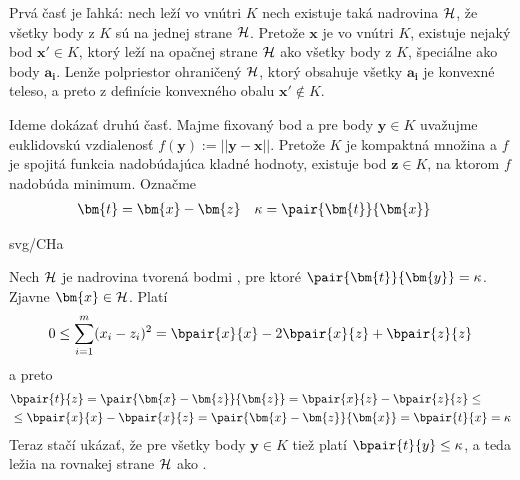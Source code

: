 \begin{shaded}
\begin{dokaz}
  Prvá časť je ľahká: nech  leží vo vnútri $K$ nech existuje taká nadrovina $\cal H$, že všetky body z $K$
  sú na jednej strane $\cal H$. Pretože $\bm{x}$ je vo vnútri $K$, existuje nejaký bod $\bm{x'}\in K$, ktorý leží
  na opačnej strane $\cal H$ ako všetky body z $K$, špeciálne ako body $\bm{a_i}$. 
  Lenže polpriestor ohraničený $\cal H$, ktorý obsahuje 
  všetky $\bm{a_i}$ je konvexné teleso, a preto z definície konvexného obalu $\bm{x'}\not\in K$.

\noindent
Ideme dokázať druhú časť.
Majme fixovaný  bod  a pre body $\bm{y}\in K$ uvažujme euklidovskú vzdialenosť $f(\bm{y}):=||\bm{y}-\bm{x}||$. 
  Pretože $K$ je kompaktná množina a $f$ je spojitá funkcia nadobúdajúca kladné hodnoty, existuje bod
  $\bm{z}\in K$, na ktorom $f$ nadobúda minimum. Označme 
  \begin{align*}
    \bm{t}&=\bm{x}-\bm{z} & \kappa&= \pair{\bm{t}}{\bm{x}}
  \end{align*}

\begin{minipage}[t]{4.5cm}
  \vspace{0pt}
  \begin{myfig}{\textwidth}{svg/CHa}
  \end{myfig}
\end{minipage}\hspace*{1cm}\begin{minipage}[t]{\textwidth-7cm}
  \vspace{0pt}
  Nech $\cal H$ je nadrovina tvorená bodmi , pre ktoré $\pair{\bm{t}}{\bm{y}}=\kappa$.
  Zjavne $\bm{x}\in{\cal H}$. Platí
  $$0\le\sum_{i=1}^m(x_i-z_i)^2=%
  \bpair{x}{x}-2\bpair{x}{z}+\bpair{z}{z}$$
  a preto
  \begin{align*}&\bpair{t}{z}=\pair{\bm{x}-\bm{z}}{\bm{z}}=\bpair{x}{z}-\bpair{z}{z}\le\\
                &\le\bpair{x}{x}-\bpair{x}{z}=\pair{\bm{x}-\bm{z}}{\bm{x}}=\bpair{t}{x}=\kappa
  \end{align*}
  \noindent
  Teraz stačí ukázať, že pre všetky body $\bm{y}\in K$ tiež platí $\bpair{t}{y}\le\kappa$, a teda
  ležia na rovnakej strane $\cal H$ ako .
\end{minipage}


\end{dokaz}
\end{shaded}

